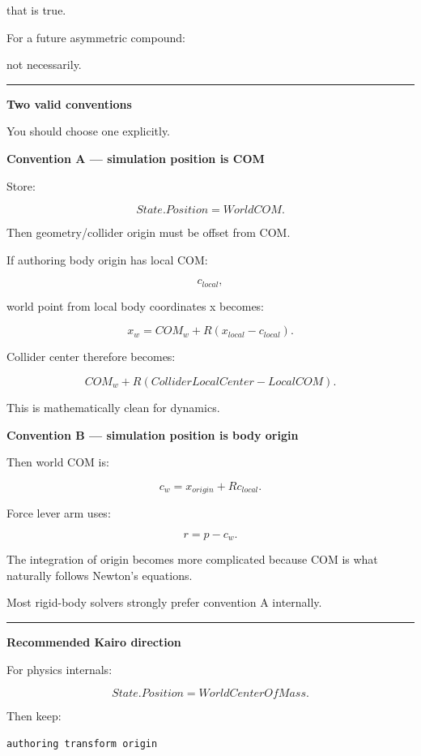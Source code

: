 that is true.

For a future asymmetric compound:

not necessarily.

\begin{center}\rule{0.5\linewidth}{0.5pt}\end{center}

\textbf{Two valid conventions}

You should choose one explicitly.

\textbf{Convention A --- simulation position is COM}

Store:

\[
State.Position
=
WorldCOM.
\]

Then geometry/collider origin must be offset from COM.

If authoring body origin has local COM:

\[
c_{local},
\]

world point from local body coordinates x becomes:

\[
x_w
=
COM_w
+
R(x_{local}-c_{local}).
\]

Collider center therefore becomes:

\[
COM_w
+
R(
ColliderLocalCenter-
LocalCOM).
\]

This is mathematically clean for dynamics.

\textbf{Convention B --- simulation position is body origin}

Then world COM is:

\[
\boxed{
c_w
=
x_{origin}
+
Rc_{local}.
}
\]

Force lever arm uses:

\[
r=
p-c_w.
\]

The integration of origin becomes more complicated because COM is what naturally follows Newton's equations.

Most rigid-body solvers strongly prefer convention A internally.

\begin{center}\rule{0.5\linewidth}{0.5pt}\end{center}

\textbf{Recommended Kairo direction}

For physics internals:

\[
\boxed{
State.Position
=
WorldCenterOfMass.
}
\]

Then keep:

\begin{verbatim}
authoring transform origin
\end{verbatim}

